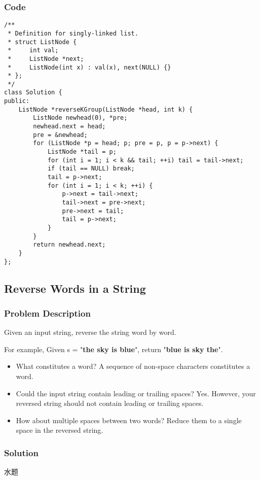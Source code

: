 \documentclass[courier]{article}
\begin{document}
\begin{CJK*}{UTF8}{gkai}
\subsubsection*{Code}
\begin{lstlisting}
/**
 * Definition for singly-linked list.
 * struct ListNode {
 *     int val;
 *     ListNode *next;
 *     ListNode(int x) : val(x), next(NULL) {}
 * };
 */
class Solution {
public:
    ListNode *reverseKGroup(ListNode *head, int k) {
        ListNode newhead(0), *pre;
        newhead.next = head;
        pre = &newhead;
        for (ListNode *p = head; p; pre = p, p = p->next) {
            ListNode *tail = p;
            for (int i = 1; i < k && tail; ++i) tail = tail->next;
            if (tail == NULL) break;
            tail = p->next;
            for (int i = 1; i < k; ++i) {
                p->next = tail->next;
                tail->next = pre->next;
                pre->next = tail;
                tail = p->next;
            }
        }
        return newhead.next;
    }
}; 
\end{lstlisting}


\subsection{ Reverse Words in a String }

\subsubsection*{Problem Description}
Given an input string, reverse the string word by word.

For example,
Given s = "\textbf{the sky is blue}",
return "\textbf{blue is sky the}".

\begin{itemize}
\item What constitutes a word?
A sequence of non-space characters constitutes a word.
\item Could the input string contain leading or trailing spaces?
Yes. However, your reversed string should not contain leading or trailing spaces.
\item How about multiple spaces between two words?
Reduce them to a single space in the reversed string.
\end{itemize}



\subsubsection*{Solution}
水题


\end{CJK*}
\end{document}
